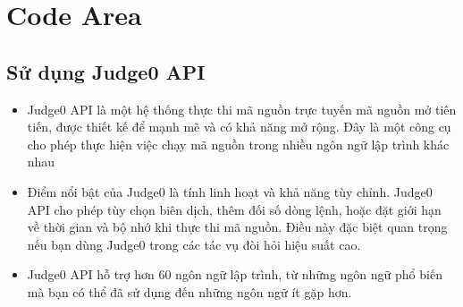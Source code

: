 \section{Code Area}
\subsection{Sử dụng Judge0 API}
\begin{itemize}
    \item Judge0 API là một hệ thống thực thi mã nguồn trực tuyến mã nguồn mở tiên tiến, được thiết kế để mạnh mẽ và có khả năng mở rộng. Đây là một công cụ cho phép thực hiện việc chạy mã nguồn trong nhiều ngôn ngữ lập trình khác nhau
    \item Điểm nổi bật của Judge0 là tính linh hoạt và khả năng tùy chỉnh. Judge0 API cho phép tùy chọn biên dịch, thêm đối số dòng lệnh, hoặc đặt giới hạn về thời gian và bộ nhớ khi thực thi mã nguồn. Điều này đặc biệt quan trọng nếu bạn dùng Judge0 trong các tác vụ đòi hỏi hiệu suất cao.
    \item Judge0 API hỗ trợ hơn 60 ngôn ngữ lập trình, từ những ngôn ngữ phổ biến mà bạn có thể đã sử dụng đến những ngôn ngữ ít gặp hơn.
\end{itemize}


